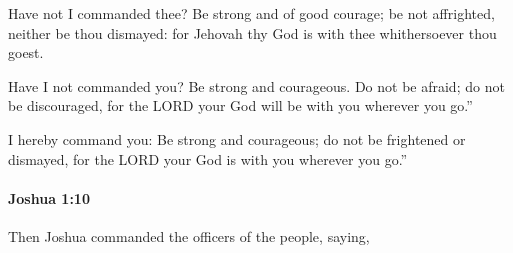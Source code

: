 			\begin{versebox}
					\item[BHS] 
					\item[ASV] Have not I commanded thee? Be strong and of good courage; be not affrighted, neither be thou dismayed: for Jehovah thy God is with thee whithersoever thou goest.
					\item[NIV] Have I not commanded you? Be strong and courageous. Do not be afraid; do not be discouraged, for the LORD your God will be with you wherever you go.”
					\item[NRSV] I hereby command you: Be strong and courageous; do not be frightened or dismayed, for the LORD your God is with you wherever you go.”
			\end{versebox}

		\paragraph{Joshua 1:10} %
			\label{JOSHUA-1-10}

			Then Joshua commanded the officers of the people, saying,

